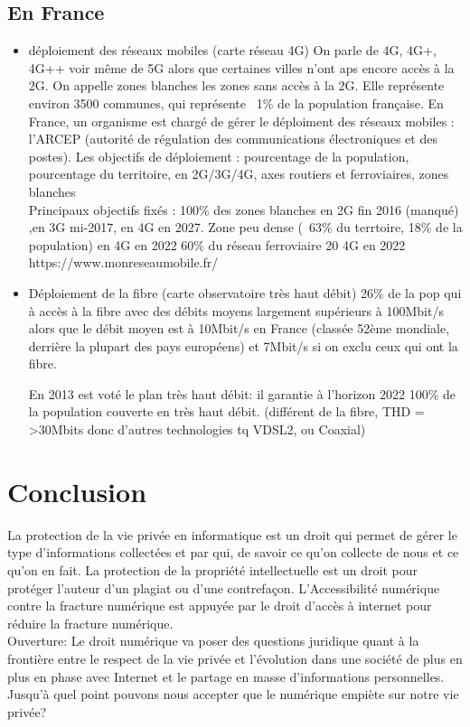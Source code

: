 \documentclass{article}
\begin{document}
\subsection{En France}
\begin{itemize}
    
\item
déploiement des réseaux mobiles (carte réseau 4G)
On parle de 4G, 4G+, 4G++ voir même de 5G alors que certaines villes n'ont aps encore accès à la 2G. On appelle zones blanches les zones sans accès à la 2G. Elle représente environ 3500 communes, qui représente ~1\% de la population française. 
En France, un organisme est chargé de gérer le déploiment des réseaux mobiles : l'ARCEP (autorité de régulation des communications électroniques et des postes).
Les objectifs de déploiement : pourcentage de la population, pourcentage du territoire, en 2G/3G/4G, axes routiers et ferroviaires, zones blanches
\\
Principaux objectifs fixés : 100\% des zones blanches en 2G fin 2016 (manqué) ,en 3G mi-2017, en 4G en 2027.
Zone peu dense (~63\% du terrtoire, 18\% de la population) en 4G en 2022
60\% du réseau ferroviaire 20 4G en 2022
https://www.monreseaumobile.fr/

\item
Déploiement de la fibre (carte observatoire très haut débit)
26\% de la pop qui à accès à la fibre avec des débits moyens largement supérieurs à 100Mbit/s alors que le débit moyen est à 10Mbit/s en France (classée 52ème mondiale, derrière la plupart des pays européens) et 7Mbit/s si on exclu ceux qui ont la fibre.

En 2013 est voté le plan très haut débit: il garantie à l'horizon 2022 100\% de la population couverte en très haut débit. (différent de la fibre, THD = >30Mbits donc d'autres technologies tq VDSL2, ou Coaxial)
\end{itemize}
\section{Conclusion}
La protection de la vie privée  en informatique est un droit qui permet de gérer le type d'informations collectées et par qui, de savoir ce qu'on collecte de nous et ce qu'on en fait.
La protection de la propriété intellectuelle est un droit pour protéger l'auteur d'un plagiat ou d'une contrefaçon.
L'Accessibilité numérique contre la fracture numérique est appuyée par le droit d'accès à internet pour réduire la fracture numérique. \\
Ouverture: Le droit numérique va poser des questions juridique quant à la frontière entre le respect de la vie privée et l'évolution dans une société de plus en plus en phase avec Internet et le partage en masse d'informations personnelles. Jusqu'à quel point pouvons nous accepter que le numérique empiète sur notre vie privée?
\end{document}
